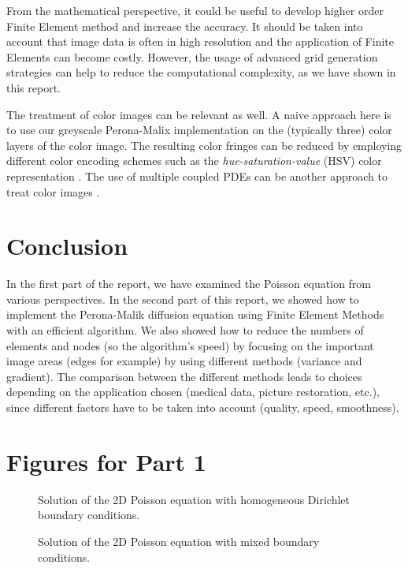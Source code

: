 \documentclass{report}
\begin{document}
From the mathematical perspective, it could be useful to develop higher order Finite Element method and increase the accuracy. It should be taken into account that image data is often in high resolution and the application of Finite Elements can become costly. However, the usage of advanced grid generation strategies can help to reduce the computational complexity, as we have shown in this report.

The treatment of color images can be relevant as well. A naive approach here is to use our greyscale Perona-Malix implementation on the (typically three) color layers of the color image. The resulting color fringes can be reduced by employing different color encoding schemes such as the \emph{hue-saturation-value} (HSV) color representation \citep{bredies2010}. The use of multiple coupled PDEs can be another approach to treat color images \citep{bredies2010}.

\chapter{Conclusion}

In the first part of the report, we have examined the Poisson equation from various perspectives. In the second part of this report, we showed how to implement the Perona-Malik diffusion equation using Finite Element Methods with an efficient algorithm. We also showed how to reduce the numbers of elements and nodes (so the algorithm's speed) by focusing on the important image areas (edges for example) by using different methods (variance and gradient). The comparison between the different methods leads to choices depending on the application chosen (medical data, picture restoration, etc.), since different factors have to be taken into account (quality, speed, smoothness). 



\appendix

\chapter{Figures for Part 1}

\begin{figure}
	\caption{Solution of the 2D Poisson equation with homogeneous Dirichlet boundary conditions.}
	\label{vis:2dpoissondir}
\end{figure}

\begin{figure}
	\caption{Solution of the 2D Poisson equation with mixed boundary conditions.}
	\label{vis:2dpoissonneu}
\end{figure}
\end{document}
